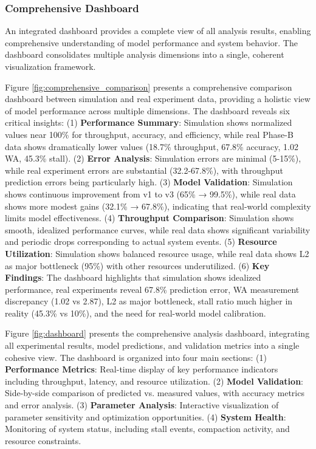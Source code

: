 \documentclass[11pt]{article}
\begin{document}
\subsubsection{Comprehensive Dashboard}
An integrated dashboard provides a complete view of all analysis results, enabling comprehensive understanding of model performance and system behavior. The dashboard consolidates multiple analysis dimensions into a single, coherent visualization framework.

Figure \ref{fig:comprehensive_comparison} presents a comprehensive comparison dashboard between simulation and real experiment data, providing a holistic view of model performance across multiple dimensions. The dashboard reveals six critical insights: (1) \textbf{Performance Summary}: Simulation shows normalized values near 100\% for throughput, accuracy, and efficiency, while real Phase-B data shows dramatically lower values (18.7\% throughput, 67.8\% accuracy, 1.02 WA, 45.3\% stall). (2) \textbf{Error Analysis}: Simulation errors are minimal (5-15\%), while real experiment errors are substantial (32.2-67.8\%), with throughput prediction errors being particularly high. (3) \textbf{Model Validation}: Simulation shows continuous improvement from v1 to v3 (65\% → 99.5\%), while real data shows more modest gains (32.1\% → 67.8\%), indicating that real-world complexity limits model effectiveness. (4) \textbf{Throughput Comparison}: Simulation shows smooth, idealized performance curves, while real data shows significant variability and periodic drops corresponding to actual system events. (5) \textbf{Resource Utilization}: Simulation shows balanced resource usage, while real data shows L2 as major bottleneck (95\%) with other resources underutilized. (6) \textbf{Key Findings}: The dashboard highlights that simulation shows idealized performance, real experiments reveal 67.8\% prediction error, WA measurement discrepancy (1.02 vs 2.87), L2 as major bottleneck, stall ratio much higher in reality (45.3\% vs 10\%), and the need for real-world model calibration.

Figure \ref{fig:dashboard} presents the comprehensive analysis dashboard, integrating all experimental results, model predictions, and validation metrics into a single cohesive view. The dashboard is organized into four main sections: (1) \textbf{Performance Metrics}: Real-time display of key performance indicators including throughput, latency, and resource utilization. (2) \textbf{Model Validation}: Side-by-side comparison of predicted vs. measured values, with accuracy metrics and error analysis. (3) \textbf{Parameter Analysis}: Interactive visualization of parameter sensitivity and optimization opportunities. (4) \textbf{System Health}: Monitoring of system status, including stall events, compaction activity, and resource constraints.
\end{document}
